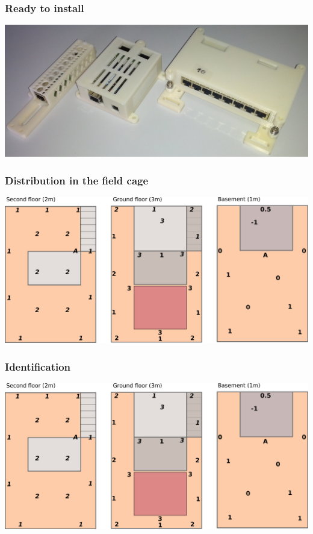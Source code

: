\documentclass[t]{beamer}
\begin{document}
\begin{frame}[c]
    \frametitle{Ready to install}
  \begin{center}
  	\includegraphics[width=0.9\linewidth]{img/pic/cases.jpg}\\
  \vspace{0.5cm}
  \end{center}
\end{frame}
\begin{frame}[c]
    \frametitle{Distribution in the field cage}
  \begin{center}
  	\includegraphics[width=0.9\linewidth]{img/installPlan.pdf}\\
  \vspace{0.5cm}
  \end{center}
\end{frame}
\begin{frame}[c]
    \frametitle{Identification}
  \begin{center}
  	\includegraphics[width=0.9\linewidth]{img/installPlan.pdf}\\
  \vspace{0.5cm}
  \end{center}
\end{frame}
\end{document}
